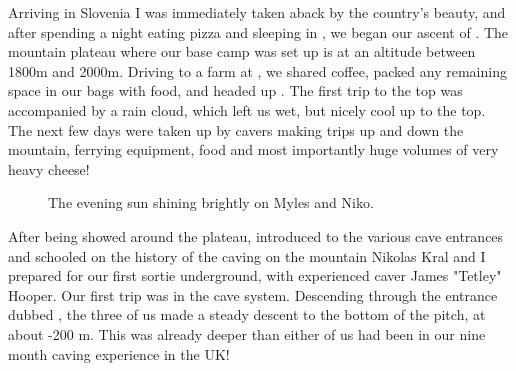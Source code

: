 Arriving in Slovenia I was immediately taken aback by the country's beauty, and after spending
a night eating pizza and sleeping in , we began our ascent of . The mountain plateau
where our base camp was set up is at an altitude between 1800m and 2000m. Driving to a farm at
, we shared coffee, packed any remaining space in our bags with food, and headed up .
The first trip to the top was accompanied by a rain cloud, which left us wet, but nicely cool up to the
top. The next few days were taken up by cavers making trips up and down the mountain, ferrying
equipment, food and most importantly huge volumes of very heavy cheese!


\begin{figure}[t!]
\checkoddpage \ifoddpage \forcerectofloat \else \forceversofloat \fi
{}
\caption{The evening sun shining brightly on Myles and Niko. }
\end{figure}





After being showed around the plateau, introduced to the various cave entrances and schooled on
the history of the caving on the mountain Nikolas Kral and I prepared for our first sortie underground,
with experienced caver James "Tetley" Hooper. Our first trip was in the  cave system.
Descending through the entrance dubbed , the three of us made a steady descent to
the bottom of the  pitch, at about -200 m. This was already deeper than either of us had been
in our nine month caving experience in the UK!


